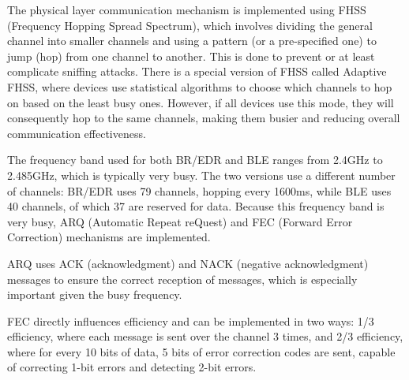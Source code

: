 \begin{questions}
\begin{solution}
        The physical layer communication mechanism is implemented using FHSS (Frequency Hopping Spread Spectrum), which involves dividing the general channel into smaller channels and using a pattern (or a pre-specified one) to jump (hop) from one channel to another. This is done to prevent or at least complicate sniffing attacks. There is a special version of FHSS called Adaptive FHSS, where devices use statistical algorithms to choose which channels to hop on based on the least busy ones. However, if all devices use this mode, they will consequently hop to the same channels, making them busier and reducing overall communication effectiveness.

        The frequency band used for both BR/EDR and BLE ranges from 2.4GHz to 2.485GHz, which is typically very busy. The two versions use a different number of channels: BR/EDR uses 79 channels, hopping every 1600ms, while BLE uses 40 channels, of which 37 are reserved for data. Because this frequency band is very busy, ARQ (Automatic Repeat reQuest) and FEC (Forward Error Correction) mechanisms are implemented.

        ARQ uses ACK (acknowledgment) and NACK (negative acknowledgment) messages to ensure the correct reception of messages, which is especially important given the busy frequency.

        FEC directly influences efficiency and can be implemented in two ways: 1/3 efficiency, where each message is sent over the channel 3 times, and 2/3 efficiency, where for every 10 bits of data, 5 bits of error correction codes are sent, capable of correcting 1-bit errors and detecting 2-bit errors.
    \end{solution}





\end{questions}
